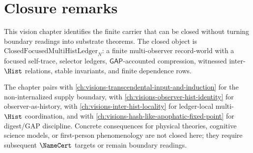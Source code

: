 \section{Closure remarks}
\label{sec:consciousness-universe-closure}

This vision chapter identifies the finite carrier that can be closed without turning boundary readings into substrate theorems. The closed object is $\mathrm{ClosedFocusedMultiHistLedger}_N$: a finite multi-observer record-world with a focused self-trace, selector ledgers, $\mathsf{GAP}$-accounted compression, witnessed inter-$\Hist$ relations, stable invariants, and finite dependence rows.

The chapter pairs with \autoref{ch:visions-transcendental-input-and-induction} for the non-internalized supply boundary, with \autoref{ch:visions-observer-hist-identity} for observer-as-history, with \autoref{ch:visions-inter-hist-locality} for ledger-local multi-$\Hist$ coordination, and with \autoref{ch:visions-hash-like-apophatic-fixed-point} for digest/GAP discipline. Concrete consequences for physical theories, cognitive science models, or first-person phenomenology are not closed here; they require subsequent $\NameCert$ targets or remain boundary readings.

